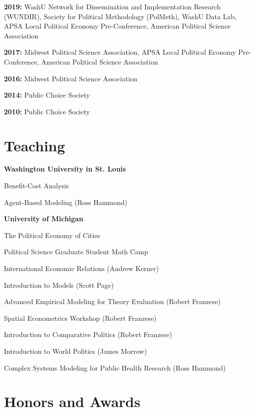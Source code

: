 \documentclass[margin,line]{res}
\newenvironment{list1}{
  \begin{list}{}{%
      \setlength{\itemsep}{0.1in}
      \setlength{\parsep}{0in} \setlength{\parskip}{0in}
      \setlength{\topsep}{0.1in} \setlength{\partopsep}{0in} 
      \setlength{\leftmargin}{0.17in}}}{\end{list}}
\begin{document}
\begin{resume}
\textbf{2019:} WashU Network for Dissemination and Implementation Research (WUNDIR), Society for Political Methodology (PolMeth), WashU Data Lab, APSA Local Political Economy Pre-Conference, American Political Science Association

\textbf{2017:} Midwest Political Science Association, APSA Local Political Economy Pre-Conference, American Political Science Association

\textbf{2016:} Midwest Political Science Association

\textbf{2014:} Public Choice Society

\textbf{2010:} Public Choice Society


\section{\sc Teaching}

\textbf{Washington University in St. Louis}
\begin{list1}
	\item[] Benefit-Cost Analysis
	\item[] Agent-Based Modeling (Ross Hammond)
\end{list1}

\textbf{University of Michigan}
\begin{list1}
	\item[] The Political Economy of Cities
	\item[] Political Science Graduate Student Math Camp
	\item International Economic Relations (Andrew Kerner)
	\item Introduction to Models (Scott Page)
	\item Advanced Empirical Modeling for Theory Evaluation (Robert Franzese)
	\item Spatial Econometrics Workshop (Robert Franzese)
	\item Introduction to Comparative Politics (Robert Franzese)
	\item Introduction to World Politics (James Morrow)
	\item Complex Systems Modeling for Public Health Research (Ross Hammond)
\end{list1}



\section{\sc Honors and Awards} 


\end{resume}
\end{document}
